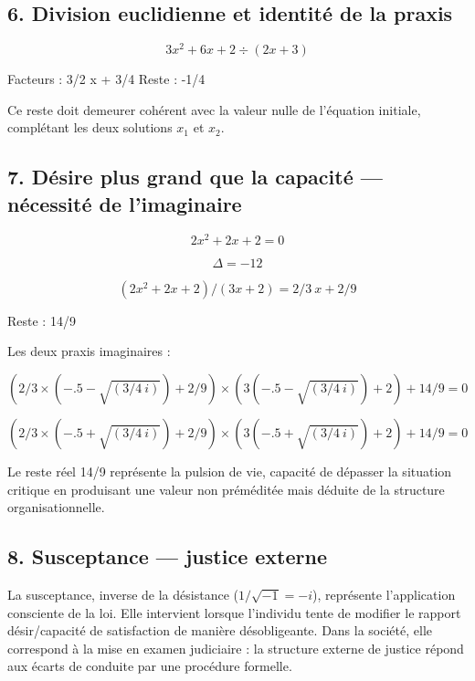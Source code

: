 \documentclass[12pt,a4paper]{article}
\begin{document}
\subsection*{6. Division euclidienne et identité de la praxis}
\[3x^2 + 6x + 2 \div (2x + 3)\]

Facteurs : 3/2 x + 3/4 Reste : -1/4

Ce reste doit demeurer cohérent avec la valeur nulle de l’équation initiale, complétant les deux solutions $x_1$ et $x_2$.

\subsection*{7. Désire plus grand que la capacité — nécessité de l’imaginaire}
\[2x^2 + 2x + 2 = 0\]

\[\Delta = -12\]

\[(2x^2 + 2x + 2) / (3x + 2) = 2/3\ x + 2/9\]

Reste : 14/9

Les deux praxis imaginaires :

\[(2/3\times(-.5-\sqrt{(3/4\ i)})+2/9)\times(3(-.5-\sqrt{(3/4\ i)})+2)+14/9=0\]

\[(2/3\times(-.5+\sqrt{(3/4\ i)})+2/9)\times(3(-.5+\sqrt{(3/4\ i)})+2)+14/9=0\]

Le reste réel 14/9 représente la pulsion de vie, capacité de dépasser la situation critique en produisant une valeur non préméditée mais déduite de la structure organisationnelle.

\subsection*{8. Susceptance — justice externe}
La susceptance, inverse de la désistance ($1/\sqrt{-1} = -i$), représente l’application consciente de la loi. Elle intervient lorsque l’individu tente de modifier le rapport désir/capacité de satisfaction de manière désobligeante. Dans la société, elle correspond à la mise en examen judiciaire : la structure externe de justice répond aux écarts de conduite par une procédure formelle.
\end{document}
